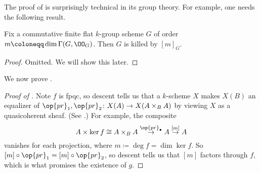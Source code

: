 \documentclass[../notes.tex]{subfiles}
\begin{document}
The proof of  is surprisingly technical in its group theory. For example, one needs the following result.
\begin{theorem}[Deligne]
	Fix a commutative finite flat $k$-group scheme $G$ of order $m\coloneqq\dim\Gamma(G,\OO_G)$. Then $G$ is killed by $[m]_G$.
\end{theorem}
\begin{proof}
	Omitted. We will show this later.
\end{proof}
We now prove .
\begin{proof}[Proof of ]
	Note $f$ is fpqc, so descent tells us that a $k$-scheme $X$ makes $X(B)$ an equalizer of $\op{pr}_1,\op{pr}_2\colon X(A)\to X(A\times_B A)$ by viewing $X$ as a quasicoherent sheaf. (See \cite[Theorem~6.2.14]{conrad-av}.) For example, the composite
	\[A\times\ker f\cong A\times_BA\stackrel{\op{pr}_\bullet}\to A\stackrel{[m]}\to A\]
	vanishes for each projection, where $m\coloneqq\deg f=\dim\ker f$. So $[m]\circ{\op{pr}_1}=[m]\circ{\op{pr}_2}$, so descent tells us that $[m]$ factors through $f$, which is what promises the existence of $g$.
\end{proof}
\end{document}
